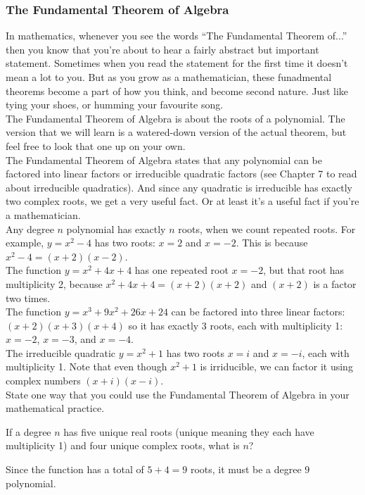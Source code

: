\documentclass[12pt,fleqn]{book}
\newcommand{\prb}[1]{\begin{Exercise}#1\end{Exercise}}
\newcommand{\sol}[1]{\begin{Answer}#1\end{Answer}}
\begin{document}
\subsubsection*{The Fundamental Theorem of Algebra}
In mathematics, whenever you see the words ``The Fundamental Theorem of...'' then you know that you're about to hear a fairly abstract but important statement.  Sometimes when you read the statement for the first time it doesn't mean a lot to you.  But as you grow as a mathematician, these funadmental theorems become a part of how you think, and become second nature.  Just like tying your shoes, or humming your favourite song.
\\[1em]
The Fundamental Theorem of Algebra is about the roots of a polynomial.  The version that we will learn is a watered-down version of the actual theorem, but feel free to look that one up on your own.
\\[1em]
The Fundamental Theorem of Algebra states that any polynomial can be factored into linear factors or irreducible quadratic factors (see Chapter 7 to read about irreducible quadratics).  And since any quadratic is irreducible has exactly two complex roots, we get a very useful fact.  Or at least it's a useful fact if you're a mathematician.
\\[1em]
Any degree $n$ polynomial has exactly $n$ roots, when we count repeated roots.  For example, $y=x^2-4$ has two roots: $x=2$ and $x=-2$.  This is because $x^2-4=(x+2)(x-2)$.
\\[1em]
The function $y=x^2+4x+4$ has one repeated root $x=-2$, but that root has multiplicity 2, because  $x^2+4x+4=(x+2)(x+2)$ and $(x+2)$ is a factor two times.
\\[1em]
The function $y=x^3+9x^2+26x + 24$ can be factored into three linear factors: $(x+2)(x+3)(x+4)$ so it has exactly 3 roots, each with multiplicity 1: $x=-2$, $x=-3$, and $x=-4$.
\\[1em]
The irreducible quadratic $y=x^2+1$ has two roots $x=i$ and $x=-i$, each with multiplicity 1.  Note that even though $x^2+1$ is irriducible, we can factor it using complex numbers $(x+i)(x-i)$.
\\[1em]
State one way that you could use the Fundamental Theorem of Algebra in your mathematical practice.
\clearpage
\prb{If a degree $n$ has five unique real roots (unique meaning they each have multiplicity 1) and four unique complex roots, what is $n$?\\[5em]}
\sol{Since the function has a total of $5+4=9$ roots, it must be a degree $9$ polynomial.}
\end{document}
